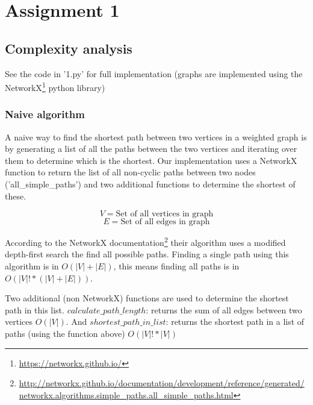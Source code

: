 \documentclass[a4paper,12px]{article}
\begin{document}
\section{Assignment 1}
\subsection{Complexity analysis}


See the code in '1.py' for full implementation (graphs are implemented using the
NetworkX\footnote{\url{https://networkx.github.io/}} python library)


\subsubsection{Naive algorithm}

A naive way to find the shortest path between two vertices in a weighted graph
is by generating a list of all the paths between the two vertices and iterating
over them to determine which is the shortest. Our implementation uses a NetworkX
function to return the list of all non-cyclic paths between two nodes
('all\_simple\_paths') and two additional functions to determine the shortest of
these.

$$V = \text{Set of all vertices in graph}$$
$$E = \text{Set of all edges in graph}$$

According to the NetworkX
documentation\footnote{\url{http://networkx.github.io/documentation/development/reference/generated/networkx.algorithms.simple\_paths.all\_simple\_paths.html}}
their algorithm uses a modified depth-first search the find all possible paths.
Finding a single path using this algorithm is in $O(|V|+|E|)$, this means
finding all paths is in $O(|V|! * (|V|+|E|))$.


Two additional (non NetworkX) functions are used to determine the shortest path
in this list. $calculate\_path\_length$: returns the sum of all edges between two
vertices $O(|V|)$. And $shortest\_path\_in\_list$: returns the shortest path in a
list of paths (using the function above) $O(|V|! * |V|)$
\end{document}
